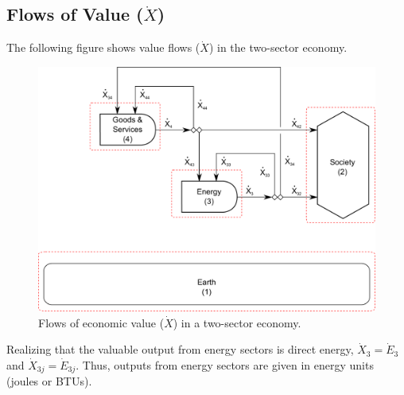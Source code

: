 \documentclass[authoryear,preprint,review,12pt]{elsarticle}
\begin{document}
\subsection{Flows of Value ($\dot{X}$)}

The following figure shows value flows ($\dot{X}$) in the two-sector economy.

\begin{figure}[h!]
\includegraphics[width=1.0\linewidth]{images/I-O_three_sector_value.pdf}
\caption{Flows of economic value ($\dot{X}$) in a two-sector economy.}
\label{fig:economic_value_flows_2}
\end{figure}

Realizing that the valuable output from energy sectors is direct energy, $\dot{X}_{3} = \dot{E}_{3}$ and $\dot{X}_{3j} = \dot{E}_{3j}$. Thus, outputs from energy sectors are given in energy units (joules or BTUs). 

%
%
%
%
\end{document}
